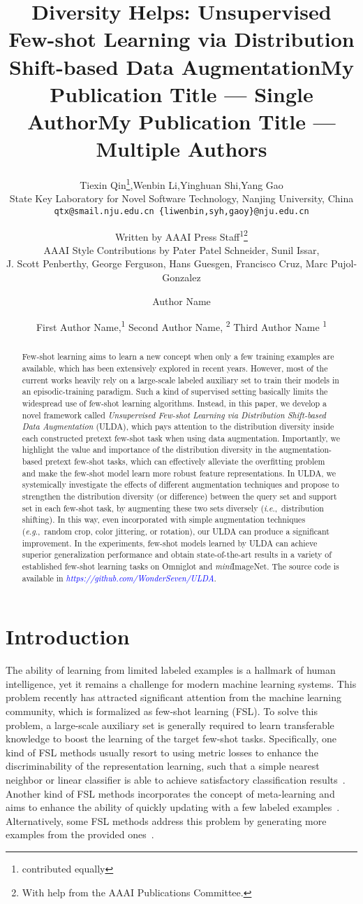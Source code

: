 \documentclass[letterpaper]{article} \usepackage{aaai21}  \usepackage{times}  \usepackage{helvet} \usepackage{courier}  \usepackage[hyphens]{url}  \usepackage{graphicx} \urlstyle{rm} \def\UrlFont{\rm}  \usepackage{natbib}  \usepackage{caption} \usepackage{url}
\title{Diversity Helps: Unsupervised Few-shot Learning via Distribution Shift-based Data Augmentation}
\author{Tiexin Qin\thanks{contributed equally},\quad Wenbin Li\footnotemark[1],\quad Yinghuan Shi,\quad Yang Gao \\
State Key Laboratory for Novel Software Technology, Nanjing University, China\\
\tt\small qtx@smail.nju.edu.cn \quad \tt\small \{liwenbin,syh,gaoy\}@nju.edu.cn}
\author{

Written by AAAI Press Staff\textsuperscript{\rm 1}\thanks{With help from the AAAI Publications Committee.}\\
    AAAI Style Contributions by Pater Patel Schneider,
    Sunil Issar,  \\
    J. Scott Penberthy,
    George Ferguson,
    Hans Guesgen,
    Francisco Cruz,
    Marc Pujol-Gonzalez
    \\
}
\title{My Publication Title --- Single Author}
\author {
Author Name \\
}
\title{My Publication Title --- Multiple Authors}
\author {


        First Author Name,\textsuperscript{\rm 1}
        Second Author Name, \textsuperscript{\rm 2}
        Third Author Name \textsuperscript{\rm 1} \\
}
\newcommand{\ie}{\textit{i}.\textit{e}.,}
\newcommand{\eg}{\textit{e}.\textit{g}.,}
\begin{document}
\maketitle
\begin{abstract}
Few-shot learning aims to learn a new concept when only a few training examples are available, which has been extensively explored in recent years. However, most of the current works heavily rely on a large-scale labeled auxiliary set to train their models in an episodic-training paradigm. Such a kind of supervised setting basically limits the widespread use of few-shot learning algorithms.
Instead, in this paper, we develop a novel framework called \emph{Unsupervised Few-shot Learning via Distribution Shift-based Data Augmentation} (ULDA), which pays attention to the distribution diversity inside each constructed pretext few-shot task when using data augmentation. Importantly, we highlight the value and importance of the distribution diversity in the augmentation-based pretext few-shot tasks, which can effectively alleviate the overfitting problem and make the few-shot model learn more robust feature representations.
In ULDA, we systemically investigate the effects of different augmentation techniques and propose to strengthen the distribution diversity (or difference) between the query set and support set in each few-shot task, by augmenting these two sets diversely (\ie~distribution shifting). In this way, even incorporated with simple augmentation techniques (\eg~random crop, color jittering, or rotation), our ULDA can produce a significant improvement. In the experiments, few-shot models learned by ULDA can achieve superior generalization performance and obtain state-of-the-art results in a variety of established few-shot learning tasks on Omniglot and \emph{mini}ImageNet. The source code is available in \textcolor{blue}{\emph{https://github.com/WonderSeven/ULDA}}.
\end{abstract}

\section{Introduction}

The ability of learning from limited labeled examples is a hallmark of human intelligence, yet it remains a challenge for modern machine learning systems. This problem recently has attracted significant attention from the machine learning community, which is formalized as few-shot learning (FSL). To solve this problem, a large-scale auxiliary set is generally required to learn transferable knowledge to boost the learning of the target few-shot tasks. Specifically, one kind of FSL methods usually resort to using metric losses to enhance the discriminability of the representation learning, such that a simple nearest neighbor or linear classifier is able to achieve satisfactory classification results~\cite{Snell2016NIPS,Vinyals2016NIPS}. Another kind of FSL methods incorporates the concept of meta-learning and aims to enhance the ability of quickly updating with a few labeled examples~\cite{FinnICML2017,RaviICLR2017,MunkhdalaiICML2017}. Alternatively, some FSL methods address this problem by generating more examples from the provided ones~\cite{Gao2018NIPS,Chen2019AAAI,ChenCVPR2019}.
\end{document}
